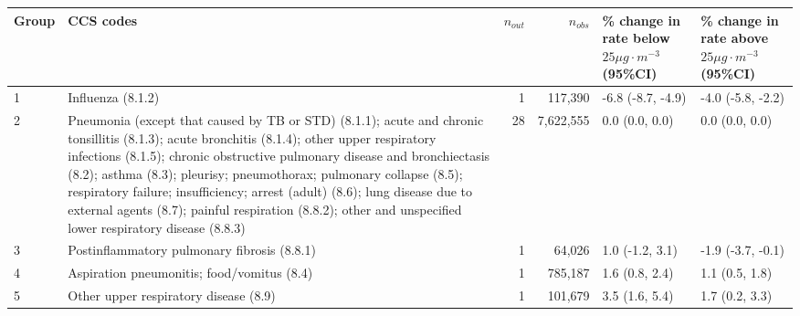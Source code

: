\begin{tabular}{lp{6.5cm}rrp{2.2cm}p{2.2cm}}
  \hline
Group & CCS codes & $n_{out}$ & $n_{obs}$ & \% change in rate below $25 \mu g \cdot m^{-3}$ (95\%CI) & \% change in rate above $25 \mu g \cdot m^{-3}$ (95\%CI) \\ 
  \hline
 1 & Influenza (8.1.2) &  1 & 117,390 & -6.8 (-8.7, -4.9) & -4.0 (-5.8, -2.2) \\ 
   2 & Pneumonia (except that caused by TB or STD) (8.1.1); acute and chronic tonsillitis (8.1.3); acute bronchitis (8.1.4); other upper respiratory infections (8.1.5); chronic obstructive pulmonary disease and bronchiectasis (8.2); asthma (8.3); pleurisy; pneumothorax; pulmonary collapse (8.5); respiratory failure; insufficiency; arrest (adult) (8.6); lung disease due to external agents (8.7); painful respiration (8.8.2); other and unspecified lower respiratory disease (8.8.3) & 28 & 7,622,555 & 0.0 (0.0, 0.0) & 0.0 (0.0, 0.0) \\ 
   3 & Postinflammatory pulmonary fibrosis (8.8.1) &  1 & 64,026 & 1.0 (-1.2, 3.1) & -1.9 (-3.7, -0.1) \\ 
   4 & Aspiration pneumonitis; food/vomitus (8.4) &  1 & 785,187 & 1.6 (0.8, 2.4) & 1.1 (0.5, 1.8) \\ 
   5 & Other upper respiratory disease (8.9) &  1 & 101,679 & 3.5 (1.6, 5.4) & 1.7 (0.2, 3.3) \\ 
   \hline
\end{tabular}


